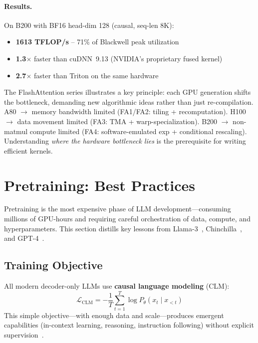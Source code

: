 \paragraph{Results.}
\label{results.}

On B200 with BF16 head-dim 128 (causal, seq-len 8K):

\begin{itemize}
  \item \textbf{1613 TFLOP/s} -- 71\% of Blackwell peak utilization
  \item \textbf{1.3$\times$} faster than cuDNN~9.13 (NVIDIA’s proprietary fused kernel)
  \item \textbf{2.7$\times$} faster than Triton on the same hardware
\end{itemize}

\begin{intuitionbox}
The FlashAttention series illustrates a key principle: each GPU generation shifts the bottleneck, demanding new algorithmic ideas rather than just re-compilation. A80 $\to$ memory bandwidth limited (FA1/FA2: tiling + recomputation). H100 $\to$ data movement limited (FA3: TMA + warp-specialization). B200 $\to$ non-matmul compute limited (FA4: software-emulated exp + conditional rescaling). Understanding \emph{where the hardware bottleneck lies} is the prerequisite for writing efficient kernels.
\end{intuitionbox}

\section{Pretraining: Best Practices}
\label{sec:pretraining}

Pretraining is the most expensive phase of LLM development---consuming millions of GPU-hours and requiring careful orchestration of data, compute, and hyperparameters. This section distills key lessons from Llama-3~\cite{grattafiori2024llama3}, Chinchilla~\cite{hoffmann2022chinchilla}, and GPT-4~\cite{openai2023gpt4}.

\subsection{Training Objective}
\label{training-objective}

All modern decoder-only LLMs use \textbf{causal language modeling} (CLM): 
\[
\mathcal{L}_\text{CLM} = -\frac{1}{T}\sum_{t=1}^T \log P_\theta(x_t \mid x_{<t})
\]
 This simple objective---with enough data and scale---produces emergent capabilities (in-context learning, reasoning, instruction following) without explicit supervision~\cite{brown2020language}.

